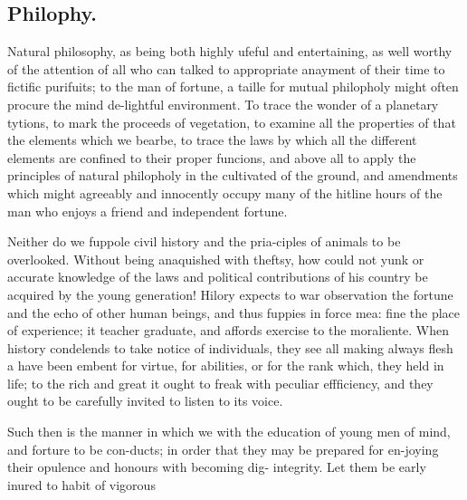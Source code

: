 \subsection*{Philophy.}
Natural philosophy, as being both highly ufeful and entertaining, as well worthy of the attention of all who can talked to appropriate anayment of their time to fictific purifuits; to the man of fortune, a taille for mutual philopholy might often procure the mind de-lightful environment. To trace the wonder of a planetary tytions, to mark the proceeds of vegetation, to examine all the properties of that the elements which we bearbe, to trace the laws by which all the different elements are confined to their proper funcions, and above all to apply the principles of natural philopholy in the cultivated of the ground, and amendments which might agreeably and innocently occupy many of the hitline hours of the man who enjoys a friend and independent fortune.\par\medskip
Neither do we fuppole civil history and the pria-ciples of animals to be overlooked. Without being anaquished with theftsy, how could not yunk or accurate knowledge of the laws and political contributions of his country be acquired by the young generation! Hilory expects to war observation the fortune and the echo of other human beings, and thus fuppies in force mea: fine the place of experience; it teacher graduate, and affords exercise to the moraliente. When history condelends to take notice of individuals, they see all making always flesh a have been embent for virtue, for abilities, or for the rank which, they held in life; to the rich and great it ought to freak with peculiar effficiency, and they ought to be carefully invited to listen to its voice.\par\medskip
Such then is the manner in which we with the education of young men of mind, and forture to be con-ducts; in order that they may be prepared for en-joying their opulence and honours with becoming dig- integrity. Let them be early inured to habit of vigorous\par\medskip

